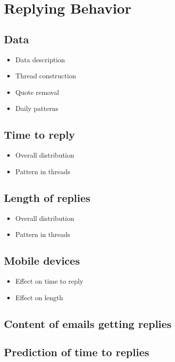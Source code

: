 \section{Replying Behavior}\label{section:behavior}

\subsection{Data}
\begin{itemize}
\item Data description
\item Thread construction
\item Quote removal
\item Daily patterns
\end{itemize}

\subsection{Time to reply}
\begin{itemize}
\item Overall distribution
\item Pattern in threads
\end{itemize}
\subsection{Length of replies}
\begin{itemize}
\item Overall distribution
\item Pattern in threads
\end{itemize}

\subsection{Mobile devices}
\begin{itemize}
\item Effect on time to reply
\item Effect on length
\end{itemize}

\subsection{Content of emails getting replies}

\subsection{}

\subsection{Prediction of time to replies}

\subsection{}